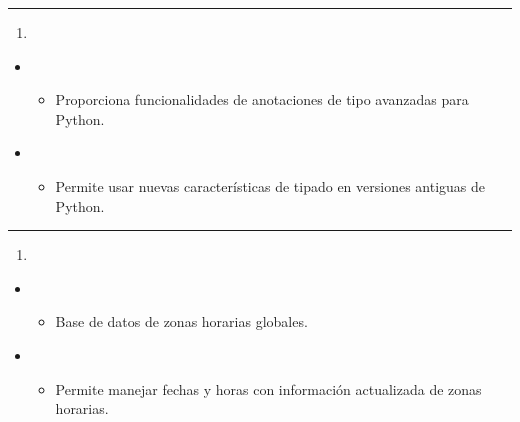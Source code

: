 \documentclass[a4paper,10pt,oneside,spanish,openany]{sphinxmanual}
\begin{document}
\bigskip\hrule\bigskip

\begin{enumerate}
%
\setcounter{enumi}{38}
\item {} 
\sphinxAtStartPar
{}

\end{enumerate}
\begin{itemize}
\item {} 
\sphinxAtStartPar
{}
\begin{itemize}
\item {} 
\sphinxAtStartPar
Proporciona funcionalidades de anotaciones de tipo avanzadas para Python.

\end{itemize}

\item {} 
\sphinxAtStartPar
{}
\begin{itemize}
\item {} 
\sphinxAtStartPar
Permite usar nuevas características de tipado en versiones antiguas de Python.

\end{itemize}

\end{itemize}


\bigskip\hrule\bigskip

\begin{enumerate}
%
\setcounter{enumi}{39}
\item {} 
\sphinxAtStartPar
{}

\end{enumerate}
\begin{itemize}
\item {} 
\sphinxAtStartPar
{}
\begin{itemize}
\item {} 
\sphinxAtStartPar
Base de datos de zonas horarias globales.

\end{itemize}

\item {} 
\sphinxAtStartPar
{}
\begin{itemize}
\item {} 
\sphinxAtStartPar
Permite manejar fechas y horas con información actualizada de zonas horarias.

\end{itemize}

\end{itemize}
\end{document}
